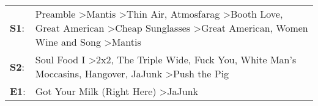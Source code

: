 \begin{supertabular}{p{0.03\textwidth}p{0.92\textwidth}}
 \textbf{S1}:  &  Preamble\textsuperscript{} \textgreater \enspace Mantis\textsuperscript{} \textgreater \enspace Thin Air\textsuperscript{}, \enspace Atmosfarag\textsuperscript{} \textgreater \enspace Booth Love\textsuperscript{}, \enspace Great American\textsuperscript{} \textgreater \enspace Cheap Sunglasses\textsuperscript{} \textgreater \enspace Great American\textsuperscript{}, \enspace Women Wine and Song\textsuperscript{} \textgreater \enspace Mantis\textsuperscript{}  \enspace  \\
 \textbf{S2}:  &                                                                                                                                       Soul Food I\textsuperscript{} \textgreater \enspace 2x2\textsuperscript{}, \enspace The Triple Wide\textsuperscript{}, \enspace Fuck You\textsuperscript{}, \enspace White Man's Moccasins\textsuperscript{}, \enspace Hangover\textsuperscript{}, \enspace JaJunk\textsuperscript{} \textgreater \enspace Push the Pig\textsuperscript{}  \enspace  \\
 \textbf{E1}:  &                                                                                                                                                                                                                                                                                                                                                                                     Got Your Milk (Right Here)\textsuperscript{} \textgreater \enspace JaJunk\textsuperscript{}  \enspace  \\
\end{supertabular}
